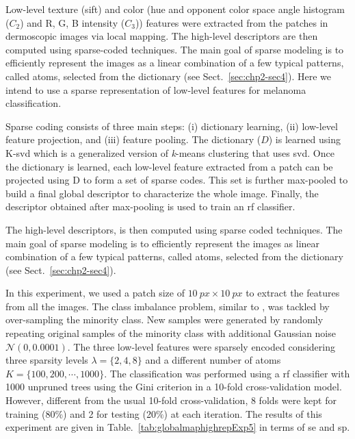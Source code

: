 Low-level texture (\ac{sift}) and color (hue and opponent color space angle histogram ($C_{2}$) and R, G, B intensity ($C_{3}$)) features were extracted from the patches in dermoscopic images via local mapping.
The high-level descriptors are then computed using sparse-coded techniques.
The main goal of sparse modeling is to efficiently represent the images as a linear combination of a few typical patterns, called atoms, selected from the dictionary (see Sect.~\ref{sec:chp2-sec4}).
Here we intend to use a sparse representation of low-level features for melanoma classification.

Sparse coding consists of three main steps: (i) dictionary learning, (ii) low-level feature projection, and (iii) feature pooling.
The dictionary ($D$) is learned using K-\ac{svd} which is a generalized version of \textit{k}-means clustering that uses \ac{svd}.
Once the dictionary is learned, each low-level feature extracted from a patch can be projected using D to form a set of sparse codes.
This set is further max-pooled to build a final global descriptor to characterize the whole image.
Finally, the descriptor obtained after max-pooling is used to train an \ac{rf} classifier.
%

The high-level descriptors, is then computed using sparse coded techniques.
The main goal of sparse modeling is to efficiently represent the images as linear combination of a few typical patterns, called atoms, selected from the dictionary (see Sect.~\ref{sec:chp2-sec4}).

In this experiment, we used a patch size of $\SI{10}{px} \times \SI{10}{px}$ to extract the features from all the images. 
The class imbalance problem, similar to \cite{barata2013two}, was tackled by over-sampling the minority class.
New samples were generated by randomly repeating original samples of the minority class with additional Gaussian noise $\mathcal{N}(0, 0.0001)$.
The three low-level features were sparsely encoded considering three sparsity levels $\lambda=\{2,4,8\}$ and a different number of atoms $K = \{100, 200, \cdots, 1000\}$.
The classification was performed using a \ac{rf} classifier with 1000 unpruned trees using the Gini criterion in a 10-fold cross-validation model.
However, different from the usual 10-fold cross-validation, 8 folds were kept for training (80$\%$) and 2 for testing (20$\%$) at each iteration.
The results of this experiment are given in Table.~\ref{tab:globalmaphighrepExp5} in terms of \ac{se} and \ac{sp}.

